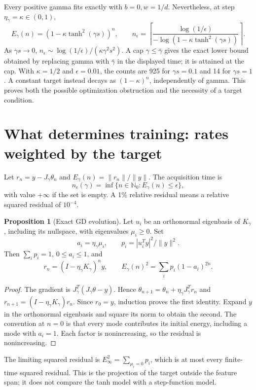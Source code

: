 \documentclass[11pt]{article}
\theoremstyle{definition}
\newtheorem{proposition}{Proposition}
\begin{document}
Every positive gamma fits exactly with $b=0,w=1/d$. Nevertheless, at step
$\eta_\gamma=\kappa\in(0,1)$,
\begin{equation*}
 E_\gamma(n)=(1-\kappa\tanh^2(\gamma s))^n,\qquad
 n_\epsilon=\left\lceil\frac{\log(1/\epsilon)}
 {-\log(1-\kappa\tanh^2(\gamma s))}\right\rceil.
\end{equation*}
As $\gamma s\to0$, $n_\epsilon\sim\log(1/\epsilon)/(\kappa\gamma^2s^2)$.
A cap $\gamma\le\bar\gamma$ gives the exact lower bound obtained by replacing
gamma with $\bar\gamma$ in the displayed time; it is attained at the cap.
With $\kappa=1/2$ and $\epsilon=0.01$, the counts are 925 for $\gamma s=0.1$
and 14 for $\gamma s=1$. A constant target instead decays as $(1-\kappa)^n$,
independently of gamma. This proves both the possible optimization obstruction
and the necessity of a target condition.

\section{What determines training: rates weighted by the target}
Let $r_n=y-J_\gamma\theta_n$ and $E_\gamma(n)=\|r_n\|/\|y\|$.
The acquisition time is
\begin{equation*}
 n_\epsilon(\gamma)=\inf\{n\in\mathbb N_0:E_\gamma(n)\le\epsilon\},
\end{equation*}
with value $+\infty$ if the set is empty. A 1\% relative residual means a
relative squared residual of $10^{-4}$.

\begin{proposition}[Exact GD evolution]
Let $u_i$ be an orthonormal eigenbasis of $K_\gamma$, including its nullspace,
with eigenvalues $\mu_i\ge0$. Set
\begin{equation*}
 a_i=\eta_\gamma\mu_i,\qquad p_i=|u_i^Ty|^2/\|y\|^2.
\end{equation*}
Then $\sum_i p_i=1$, $0\le a_i\le1$, and
\begin{equation}\label{eq:gd}
 \boxed{r_n=(I-\eta_\gamma K_\gamma)^ny,\qquad
 E_\gamma(n)^2=\sum_i p_i(1-a_i)^{2n}.}
\end{equation}
\end{proposition}
\begin{proof}
The gradient is $J_\gamma^T(J_\gamma\theta-y)$. Hence
$\theta_{n+1}=\theta_n+\eta_\gamma J_\gamma^Tr_n$ and
$r_{n+1}=(I-\eta_\gamma K_\gamma)r_n$. Since $r_0=y$, induction proves
the first identity. Expand $y$ in the orthonormal eigenbasis and square its
norm to obtain the second. The convention at $n=0$ is that every mode
contributes its initial energy, including a mode with $a_i=1$. Each factor
is nonincreasing, so the residual is nonincreasing.
\end{proof}
The limiting squared residual is $E_\infty^2=\sum_{\mu_i=0}p_i$, which is at
most every finite-time squared residual. This is the projection of the target
outside the feature span; it does not compare the tanh model with a
step-function model.
\end{document}
